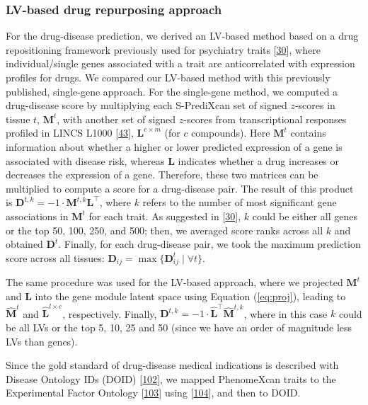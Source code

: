\documentclass[
]{article}
\begin{document}
\hypertarget{sec:methods:drug}{%
\subsubsection{LV-based drug repurposing approach}\label{sec:methods:drug}}

For the drug-disease prediction, we derived an LV-based method based on a drug repositioning framework previously used for psychiatry traits {[}\protect\hyperlink{ref-17oeJ0CXy}{30}{]}, where individual/single genes associated with a trait are anticorrelated with expression profiles for drugs.
We compared our LV-based method with this previously published, single-gene approach.
For the single-gene method, we computed a drug-disease score by multiplying each S-PrediXcan set of signed \(z\)-scores in tissue \(t\), \(\mathbf{M}^t\), with another set of signed \(z\)-scores from transcriptional responses profiled in LINCS L1000 {[}\protect\hyperlink{ref-F7lIlh2N}{43}{]}, \(\mathbf{L}^{c \times m}\) (for \(c\) compounds).
Here \(\mathbf{M}^t\) contains information about whether a higher or lower predicted expression of a gene is associated with disease risk, whereas \(\mathbf{L}\) indicates whether a drug increases or decreases the expression of a gene.
Therefore, these two matrices can be multiplied to compute a score for a drug-disease pair.
The result of this product is \(\mathbf{D}^{t,k}=-1 \cdot \mathbf{M}^{t,k} \mathbf{L}^\top\), where \(k\) refers to the number of most significant gene associations in \(\mathbf{M}^t\) for each trait.
As suggested in {[}\protect\hyperlink{ref-17oeJ0CXy}{30}{]}, \(k\) could be either all genes or the top 50, 100, 250, and 500; then, we averaged score ranks across all \(k\) and obtained \(\mathbf{D}^t\).
Finally, for each drug-disease pair, we took the maximum prediction score across all tissues: \(\mathbf{D}_{ij} = \max \{ \mathbf{D}_{ij}^t \mid \forall t \}\).

The same procedure was used for the LV-based approach, where we projected \(\mathbf{M}^{t}\) and \(\mathbf{L}\) into the gene module latent space using Equation (\ref{eq:proj}), leading to \(\hat{\mathbf{M}}^t\) and \(\hat{\mathbf{L}}^{l \times c}\), respectively.
Finally, \(\mathbf{D}^{t,k}=-1 \cdot \hat{\mathbf{L}}^{\top} \hat{\mathbf{M}}^{t,k}\), where in this case \(k\) could be all LVs or the top 5, 10, 25 and 50 (since we have an order of magnitude less LVs than genes).

Since the gold standard of drug-disease medical indications is described with Disease Ontology IDs (DOID) {[}\protect\hyperlink{ref-1FsruosUW}{102}{]}, we mapped PhenomeXcan traits to the Experimental Factor Ontology {[}\protect\hyperlink{ref-9okjVu3s}{103}{]} using {[}\protect\hyperlink{ref-16RTdMKxI}{104}{]}, and then to DOID.
\end{document}
